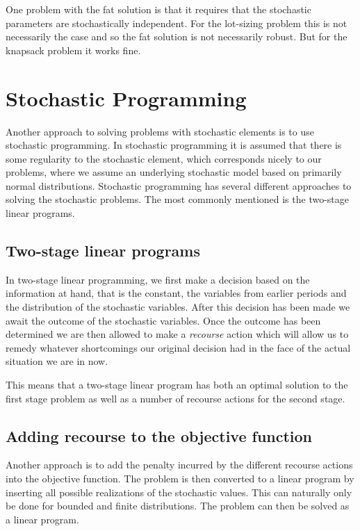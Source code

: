 One problem with the fat solution is that it requires that the
stochastic parameters are stochastically independent. For the
lot-sizing problem this is not necessarily the case and so the fat
solution is not necessarily robust. But for the knapsack problem it
works fine.

\section{Stochastic Programming}
\label{sec:stochastic_programming}

Another approach to solving problems with stochastic elements is to
use stochastic programming. In stochastic programming it is assumed
that there is some regularity to the stochastic element, which
corresponds nicely to our problems, where we assume an underlying
stochastic model based on primarily normal distributions. Stochastic
programming has several different approaches to solving the stochastic
problems. The most commonly mentioned is the two-stage linear programs.

\subsection{Two-stage linear programs}
In two-stage linear programming, we first make a decision based on
the information at hand, that is the constant, the variables from
earlier periods and the distribution of the stochastic
variables. After this decision has been made we await the outcome of
the stochastic variables. Once the outcome has been determined we are
then allowed to make a \emph{recourse} action which will allow us to
remedy whatever shortcomings our original decision had in the face of
the actual situation we are in now.

This means that a two-stage linear program has both an optimal
solution to the first stage problem as well as a number of recourse
actions for the second stage.

\subsection{Adding recourse to the objective function}
Another approach is to add the penalty incurred by the different
recourse actions into the objective function. The problem is then
converted to a linear program by inserting all possible realizations
of the stochastic values. This can naturally only be done for bounded
and finite distributions. The problem can then be solved as a linear
program. 

